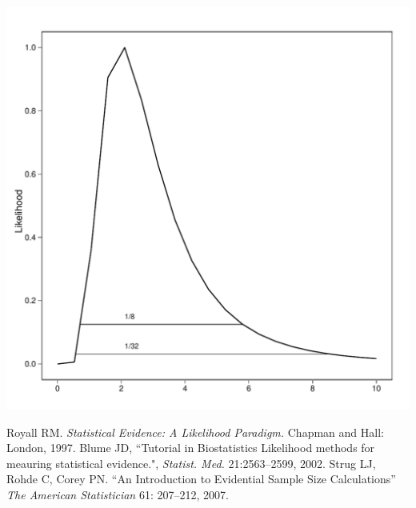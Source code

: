 \documentclass{article}
\begin{document}
\includegraphics{rr20points.pdf}
\begin{thebibliography}{9}
 Royall RM. \emph{Statistical Evidence: A Likelihood Paradigm.}
   Chapman and Hall: London, 1997.
   Blume JD, ``Tutorial in Biostatistics           %
    Likelihood methods for meauring statistical evidence.", \emph{Statist. Med.} 21:2563--2599, 2002.
     Strug LJ, Rohde C, Corey PN. ``An Introduction to Evidential Sample Size Calculations''
    \emph{The American Statistician} 61: 207--212, 2007.
\end{thebibliography}
\end{document}
